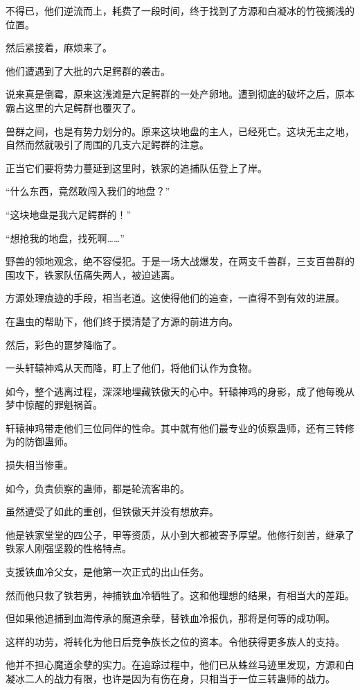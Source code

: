 \begin{this_body}
不得已，他们逆流而上，耗费了一段时间，终于找到了方源和白凝冰的竹筏搁浅的位置。

然后紧接着，麻烦来了。

他们遭遇到了大批的六足鳄群的袭击。

说来真是倒霉，原来这浅滩是六足鳄群的一处产卵地。遭到彻底的破坏之后，原本霸占这里的六足鳄群也覆灭了。

兽群之间，也是有势力划分的。原来这块地盘的主人，已经死亡。这块无主之地，自然而然就吸引了周围的几支六足鳄群的注意。

正当它们要将势力蔓延到这里时，铁家的追捕队伍登上了岸。

“什么东西，竟然敢闯入我们的地盘？”

“这块地盘是我六足鳄群的！”

“想抢我的地盘，找死啊……”

野兽的领地观念，绝不容侵犯。于是一场大战爆发，在两支千兽群，三支百兽群的围攻下，铁家队伍痛失两人，被迫逃离。

方源处理痕迹的手段，相当老道。这使得他们的追查，一直得不到有效的进展。

在蛊虫的帮助下，他们终于摸清楚了方源的前进方向。

然后，彩色的噩梦降临了。

一头轩辕神鸡从天而降，盯上了他们，将他们认作为食物。

如今，整个逃离过程，深深地埋藏铁傲天的心中。轩辕神鸡的身影，成了他每晚从梦中惊醒的罪魁祸首。

轩辕神鸡带走他们三位同伴的性命。其中就有他们最专业的侦察蛊师，还有三转修为的防御蛊师。

损失相当惨重。

如今，负责侦察的蛊师，都是轮流客串的。

虽然遭受了如此的重创，但铁傲天并没有想放弃。

他是铁家堂堂的四公子，甲等资质，从小到大都被寄予厚望。他修行刻苦，继承了铁家人刚强坚毅的性格特点。

支援铁血冷父女，是他第一次正式的出山任务。

然而他只救了铁若男，神捕铁血冷牺牲了。这和他理想的结果，有相当大的差距。

但如果他追捕到血海传承的魔道余孽，替铁血冷报仇，那将是何等的成功啊。

这样的功劳，将转化为他日后竞争族长之位的资本。令他获得更多族人的支持。

他并不担心魔道余孽的实力。在追踪过程中，他们已从蛛丝马迹里发现，方源和白凝冰二人的战力有限，也许是因为有伤在身，只相当于一位三转蛊师的战力。


\end{this_body}
